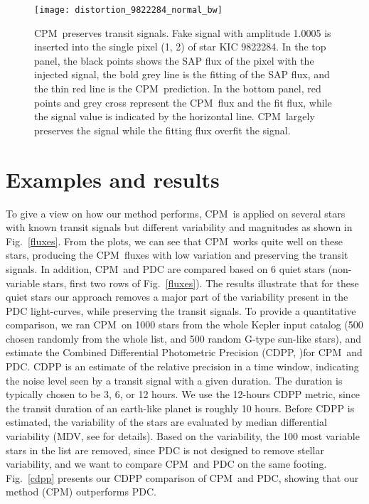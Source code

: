 \documentclass[12pt, preprint]{aastex}
\newcommand{\name}{CPM}
\begin{document}
\begin{figure}[htb]
\centering
\texttt{[image: distortion\_9822284\_normal\_bw]}
\caption{
  \label{distortion} 
  \name\ preserves transit signals. 
  Fake signal with amplitude 1.0005 is inserted into the single pixel (1, 2) of star KIC 9822284. 
  In the top panel, the black points shows the SAP flux of the pixel with the injected signal, 
    the bold grey line is the fitting of the SAP flux, and the thin red line is the \name\ prediction. 
  In the bottom panel, red points and grey cross represent the \name\ flux and the fit flux, 
    while the signal value is indicated by the horizontal line. 
  \name\ largely preserves the signal while the fitting flux overfit the signal.}
\end{figure}

\clearpage

\section{Examples and results}

To give a view on how our method performs, \name\ is applied on several stars with 
known transit signals but different variability and magnitudes as shown in Fig.~\ref{fluxes}. 
From the plots, we can see that \name\ works quite well on these stars, producing the \name\ fluxes 
with low variation and preserving the transit signals.
In addition, \name\ and PDC are compared based on 6 quiet stars 
(non-variable stars, first two rows of Fig.~\ref{fluxes}). 
The results illustrate that for these quiet stars our approach removes 
a major part of the variability present in the PDC light-curves, while preserving the transit signals. 
To provide a quantitative comparison, we ran \name\ on 1000 stars from the whole Kepler input catalog 
(500 chosen randomly from the whole list, and 500 random G-type sun-like stars), 
and estimate the Combined Differential Photometric Precision (CDPP,  \cite{cdpp1} )for \name\ and PDC. 
CDPP is an estimate of the relative precision in a time window, 
indicating the noise level seen by a transit signal with a given duration. 
The duration is typically chosen to be 3, 6, or 12 hours. 
We use the 12-hours CDPP metric, since the transit duration of an earth-like planet is roughly 10 hours. 
Before CDPP is estimated, the variability of the stars are evaluated by median differential variability 
  (MDV, see \cite{basri2013} for details). 
Based on the variability, the 100 most variable stars in the list are removed, 
  since PDC is not designed to remove stellar variability, 
  and we want to compare \name\ and PDC on the same footing.
Fig.~\ref{cdpp} presents our CDPP comparison of \name\ and PDC, 
  showing that our method (\name) outperforms PDC. 
\end{document}

